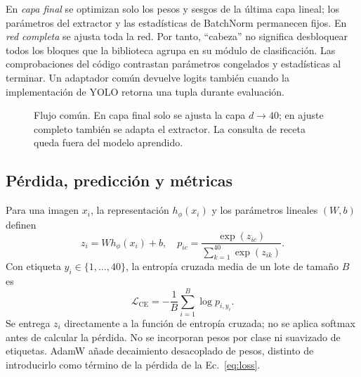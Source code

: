 \documentclass[conference]{IEEEtran}
\begin{document}
En \emph{capa final} se optimizan solo los pesos y sesgos de la última capa lineal; los parámetros del extractor y las estadísticas de BatchNorm permanecen fijos. En \emph{red completa} se ajusta toda la red. Por tanto, ``cabeza'' no significa desbloquear todos los bloques que la biblioteca agrupa en su módulo de clasificación. Las comprobaciones del código contrastan parámetros congelados y estadísticas al terminar. Un adaptador común devuelve logits también cuando la implementación de YOLO retorna una tupla durante evaluación.

\begin{figure}[t]\centering
{}
\caption{Flujo común. En capa final solo se ajusta la capa $d\rightarrow40$; en ajuste completo también se adapta el extractor. La consulta de receta queda fuera del modelo aprendido.}
\label{fig:architecture}
\end{figure}

\subsection{Pérdida, predicción y métricas}
Para una imagen $x_i$, la representación $h_\phi(x_i)$ y los parámetros lineales $(W,b)$ definen
\begin{equation}
z_i=Wh_\phi(x_i)+b,\quad
p_{ic}=\frac{\exp(z_{ic})}{\sum_{k=1}^{40}\exp(z_{ik})}.
\label{eq:logits}
\end{equation}
Con etiqueta $y_i\in\{1,\ldots,40\}$, la entropía cruzada media de un lote de tamaño $B$ es
\begin{equation}
\mathcal{L}_{\mathrm{CE}}=-\frac{1}{B}\sum_{i=1}^{B}\log p_{i,y_i}.
\label{eq:loss}
\end{equation}
Se entrega $z_i$ directamente a la función de entropía cruzada; no se aplica softmax antes de calcular la pérdida. No se incorporan pesos por clase ni suavizado de etiquetas. AdamW añade decaimiento desacoplado de pesos, distinto de introducirlo como término de la pérdida de la Ec.~\eqref{eq:loss}.
\end{document}
